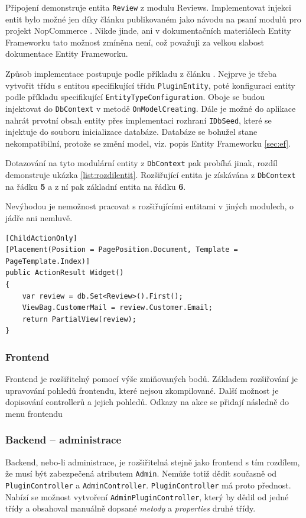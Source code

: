 \documentclass[11pt,twoside,a4paper]{book}
\begin{document}
Připojení demonstruje entita \texttt{Review} z modulu \textsf{Reviews}. Implementovat injekci entit bylo možné jen díky článku publikovaném jako návodu na psaní modulů pro projekt NopCommerce \cite{NOPE}. Nikde jinde, ani v dokumentačních materiálech Entity Frameworku tato možnost zmíněna není, což považuji za velkou slabost dokumentace Entity Frameworku.

Způsob implementace postupuje podle příkladu z článku \cite{NOPE}. Nejprve je třeba vytvořit třídu s entitou specifikující třídu \texttt{PluginEntity}, poté konfiguraci entity podle příkladu specifikující \texttt{Entity\-Type\-Configuration}. Oboje se budou injektovat do \texttt{DbContext} v metodě \texttt{OnModel\-Creating}. Dále je možné do aplikace nahrát prvotní obsah entity přes implementaci rozhraní \texttt{IDbSeed}, které se injektuje do souboru inicializace databáze. Databáze se bohužel stane nekompatibilní, protože se změní model, viz. popis Entity Frameworku \ref{sec:ef}.

Dotazování na tyto modulární entity z \texttt{DbContext} pak probíhá jinak, rozdíl demonstruje ukázka \ref{list:rozdilentit}. Rozšiřující entita je získávána z \texttt{DbContext} na řádku \textbf{5} a z ní pak základní entita na řádku \textbf{6}. 

Nevýhodou je nemožnost pracovat s rozšiřujícími entitami v jiných modulech, o jádře ani nemluvě.

\begin{lstlisting}[float=h!,language=CSharp, caption={rozdíl použití základní a rozšiřující entity}, label=list:rozdilentit]
[ChildActionOnly]
[Placement(Position = PagePosition.Document, Template = PageTemplate.Index)]
public ActionResult Widget()
{
    var review = db.Set<Review>().First();
    ViewBag.CustomerMail = review.Customer.Email;
    return PartialView(review);
}
\end{lstlisting}

\subsubsection{Frontend}

Frontend je rozšiřitelný pomocí výše zmiňovaných bodů. Základem rozšiřování je upravování pohledů frontendu, které nejsou zkompilované. Další možnost je dopisování controllerů a jejich pohledů. Odkazy na akce se přidají následně do menu frontendu

\subsubsection{Backend -- administrace}
\label{subsub:backend}
Backend, nebo-li administrace, je rozšiřitelná stejně jako frontend s tím rozdílem, že musí být zabezpečená atributem \texttt{Admin}. Nemůže totiž dědit současně od \texttt{PluginController} a \texttt{AdminController}. \texttt{PluginController} má proto přednost. Nabízí se možnost vytvoření \texttt{AdminPluginController}, který by dědil od jedné třídy a obsahoval manuálně dopsané \textit{metody} a \textit{properties} druhé třídy. 
\end{document}

